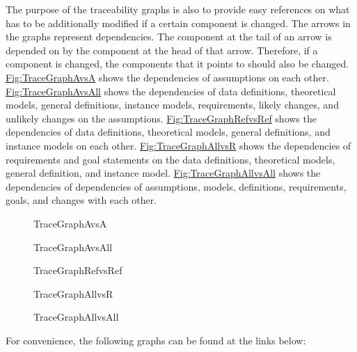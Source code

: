 \documentclass[12pt]{article}
\begin{document}
The purpose of the traceability graphs is also to provide easy references on what has to be additionally modified if a certain component is changed. The arrows in the graphs represent dependencies. The component at the tail of an arrow is depended on by the component at the head of that arrow. Therefore, if a component is changed, the components that it points to should also be changed. \hyperref[Figure:TraceGraphAvsA]{Fig:TraceGraphAvsA} shows the dependencies of assumptions on each other. \hyperref[Figure:TraceGraphAvsAll]{Fig:TraceGraphAvsAll} shows the dependencies of data definitions, theoretical models, general definitions, instance models, requirements, likely changes, and unlikely changes on the assumptions. \hyperref[Figure:TraceGraphRefvsRef]{Fig:TraceGraphRefvsRef} shows the dependencies of data definitions, theoretical models, general definitions, and instance models on each other. \hyperref[Figure:TraceGraphAllvsR]{Fig:TraceGraphAllvsR} shows the dependencies of requirements and goal statements on the data definitions, theoretical models, general definition, and instance model. \hyperref[Figure:TraceGraphAllvsAll]{Fig:TraceGraphAllvsAll} shows the dependencies of dependencies of assumptions, models, definitions, requirements, goals, and changes with each other.

\begin{figure}[H]
\begin{center}

\caption{TraceGraphAvsA}
\label{Figure:TraceGraphAvsA}
\end{center}
\end{figure}
\begin{figure}[H]
\begin{center}

\caption{TraceGraphAvsAll}
\label{Figure:TraceGraphAvsAll}
\end{center}
\end{figure}
\begin{figure}[H]
\begin{center}

\caption{TraceGraphRefvsRef}
\label{Figure:TraceGraphRefvsRef}
\end{center}
\end{figure}
\begin{figure}[H]
\begin{center}

\caption{TraceGraphAllvsR}
\label{Figure:TraceGraphAllvsR}
\end{center}
\end{figure}
\begin{figure}[H]
\begin{center}

\caption{TraceGraphAllvsAll}
\label{Figure:TraceGraphAllvsAll}
\end{center}
\end{figure}
For convenience, the following graphs can be found at the links below:
\end{document}
